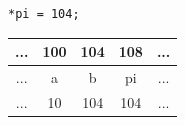 \documentclass{beamer}
\begin{document}
\begin{frame}[fragile]
\begin{columns}[t]
\begin{column}{0.5\textwidth}
\begin{center}
\begin{tabular}{c | c | c | c | c}
\end{tabular}
\end{center}

\pause

\begin{flushleft}
\begin{lstlisting}
*pi = 104;
\end{lstlisting}
\end{flushleft}

\begin{center}

\pause

\begin{tabular}{c | c | c | c | c}
... & 100 & 104 & 108 & ...\\\hline
... & a   & b   & pi  & ... \\\hline
... & 10  & \alert{104}   & 104 & ... \\

\end{tabular}
\end{center}
  \end{column}
\end{columns}



\end{frame}
\end{document}

